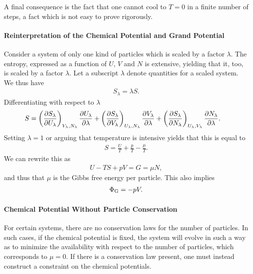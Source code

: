 A final consequence is the fact that one cannot cool to $T = 0$ in a finite number of steps, a fact which is not easy to prove rigorously.


\paragraph{Reinterpretation of the Chemical Potential and Grand Potential}
Consider a system of only one kind of particles which is scaled by a factor $\lambda$. The entropy, expressed as a function of $U$, $V$ and $N$ is extensive, yielding that it, too, is scaled by a factor $\lambda$. Let a subscript $\lambda$ denote quantities for a scaled system. We thus have
\begin{align*}
	S_{\lambda} = \lambda S.
\end{align*}
Differentiating with respect to $\lambda$ 
\begin{align*}
	S &= \left(\pdv{S_{\lambda}}{U_{\lambda}}\right)_{V_{\lambda}, N_{\lambda}}\pdv{U_{\lambda}}{\lambda} + \left(\pdv{S_{\lambda}}{V_{\lambda}}\right)_{U_{\lambda}, N_{\lambda}}\pdv{V_{\lambda}}{\lambda} + \left(\pdv{S_{\lambda}}{N_{\lambda}}\right)_{U_{\lambda}, V_{\lambda}}\pdv{N_{\lambda}}{\lambda}.
\end{align*}
Setting $\lambda = 1$ or arguing that temperature is intensive yields that this is equal to
\begin{align*}
	S = \frac{U}{T} + \frac{p}{T} - \frac{\mu}{T}. 
\end{align*}
We can rewrite this as
\begin{align*}
	U - TS + pV = G = \mu N,
\end{align*}
and thus that $\mu$ is the Gibbs free energy per particle. This also implies
\begin{align*}
	\Phi_{\text{G}} = -pV.
\end{align*}


\paragraph{Chemical Potential Without Particle Conservation}
For certain systems, there are no conservation laws for the number of particles. In such cases, if the chemical potential is fixed, the system will evolve in such a way as to minimize the availability with respect to the number of particles, which corresponds to $\mu = 0$. If there is a conservation law present, one must instead construct a constraint on the chemical potentials.

